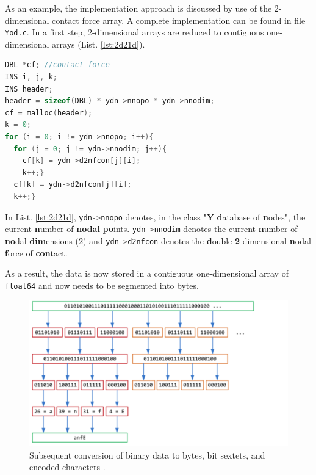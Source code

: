 \bigbreak
As an example, the implementation approach is discussed by use of the 2-dimensional contact force array. A complete implementation can be found in file \lstinline[language=C]{Yod.c}. In a first step, 2-dimensional arrays are reduced to contiguous one-dimensional arrays (List. \ref{lst:2d21d}).

\begin{lstlisting}[language=C, caption=Converting 2-dimensional array to 1-dimensional array, label=lst:2d21d]
DBL *cf; //contact force
INS i, j, k;
INS header;
header = sizeof(DBL) * ydn->nnopo * ydn->nnodim;
cf = malloc(header);
k = 0;
for (i = 0; i != ydn->nnopo; i++){
  for (j = 0; j != ydn->nnodim; j++){
    cf[k] = ydn->d2nfcon[j][i];
    k++;}
  cf[k] = ydn->d2nfcon[j][i];
  k++;}
\end{lstlisting}

In List. \ref{lst:2d21d}, \lstinline[language=C]{ydn->nnopo} denotes, in the class "\textbf{Y} \textbf{d}atabase of \textbf{n}odes", the current \textbf{n}umber of \textbf{nodal} \textbf{po}ints. \lstinline[language=C]{ydn->nnodim} denotes the current \textbf{n}umber of \textbf{no}dal \textbf{dim}ensions (2) and \lstinline[language=C]{ydn->d2nfcon} denotes the \textbf{d}ouble \textbf{2}-dimensional \textbf{n}odal \textbf{f}orce of \textbf{con}tact. 

\bigbreak
As a result, the data is now stored in a contiguous one-dimensional array of \lstinline[language=C]{float64} and now needs to be segmented into bytes.
\begin{figure}[!htbp]
    \centering
    \includegraphics[width=\columnwidth]{b64.png}
    \caption{Subsequent conversion of binary data to bytes, bit sextets, and encoded characters \cite{App}.}
    \label{fig:b64}
\end{figure}

